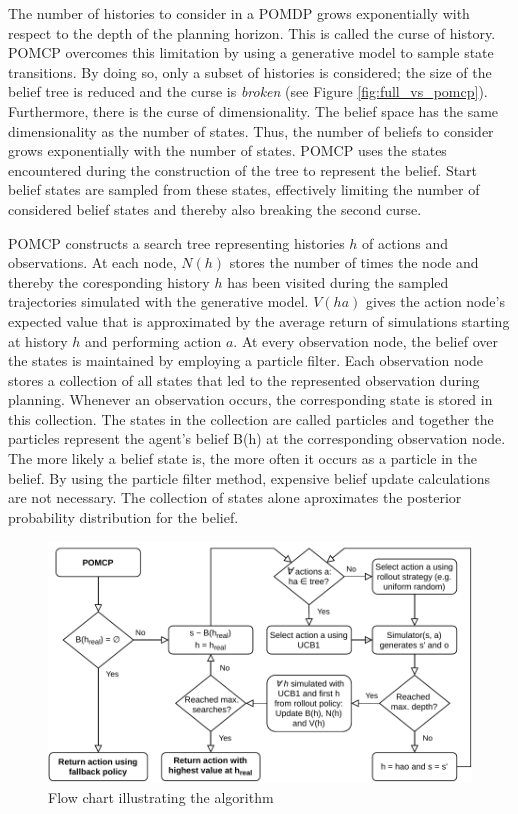 The number of histories to consider in a POMDP grows exponentially with respect to the depth of the planning horizon. This is called the curse of history. POMCP overcomes this limitation by using a generative model to sample state transitions. By doing so, only a subset of histories is considered; the size of the belief tree is reduced and the curse is \textit{broken} (see Figure \ref{fig:full_vs_pomcp}). Furthermore, there is the curse of dimensionality. The belief space has the same dimensionality as the number of states. Thus, the number of beliefs to consider grows exponentially with the number of states. POMCP uses the states encountered during the construction of the tree to represent the belief. Start belief states are sampled from these states, effectively limiting the number of considered belief states and thereby also breaking the second curse. 

POMCP constructs a search tree representing histories $h$ of actions and observations. At each node, $N(h)$ stores the number of times the node and thereby the coresponding history $h$ has been visited during the sampled trajectories simulated with the generative model. $V(ha)$ gives the action node's expected value that is approximated by the average return of simulations starting at history $h$ and performing action $a$. At every observation node, the belief over the states is maintained by employing a particle filter. Each observation node stores a collection of all states that led to the represented observation during planning. Whenever an observation occurs, the corresponding state is stored in this collection. The states in the collection are called particles and together the particles represent the agent's belief B(h) at the corresponding observation node. The more likely a belief state is, the more often it occurs as a particle in the belief. By using the particle filter method, expensive belief update calculations are not necessary. The collection of states alone aproximates the posterior probability distribution for the belief.

\begin{figure}[htbp]
    \centerfloat
    \includegraphics[width=1.0\textwidth]{figures/POMCP.pdf}
    \caption{Flow chart illustrating the  algorithm}
    \label{fig:pomcp}
\end{figure}


